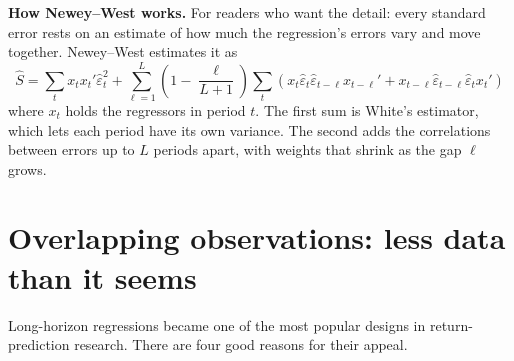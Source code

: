 \textbf{How Newey--West works.} For readers who want the detail: every
standard error rests on an estimate of how much the regression's errors vary
and move together. Newey--West estimates it as
\begin{equation}
  \hat S = \sum_t x_t x_t' \hat\varepsilon_t^2 + \sum_{\ell=1}^{L} \left(1 - \frac{\ell}{L+1}\right) \sum_t \left(x_t \hat\varepsilon_t \hat\varepsilon_{t-\ell} x_{t-\ell}' + x_{t-\ell} \hat\varepsilon_{t-\ell} \hat\varepsilon_t x_t'\right)
  \label{eq:03-nw}
\end{equation}
where $x_t$ holds the regressors in period $t$. The first sum is White's
estimator, which lets each period have its own variance. The second adds the
correlations between errors up to $L$ periods apart, with weights that shrink
as the gap $\ell$ grows.

\section{Overlapping observations: less data than it seems}
\label{sec:03-overlap}

Long-horizon regressions became one of the most popular designs in return-prediction research. There are four good reasons for their appeal.


